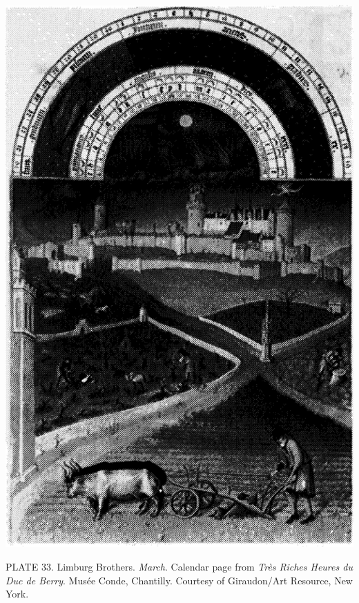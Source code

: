 \protect\hypertarget{20_ILLUSTRATIONS_FOLLOW_PAGE.xhtmlux5cux23id_2301}{}{}\includegraphics{include/html/images/349_2.png}

PLATE 33. Limburg Brothers. \emph{March}. Calendar page from \emph{Très
Riches Heures du Duc de Berry}. Musée Conde, Chantilly. Courtesy of
Giraudon/Art Resource, New York.

